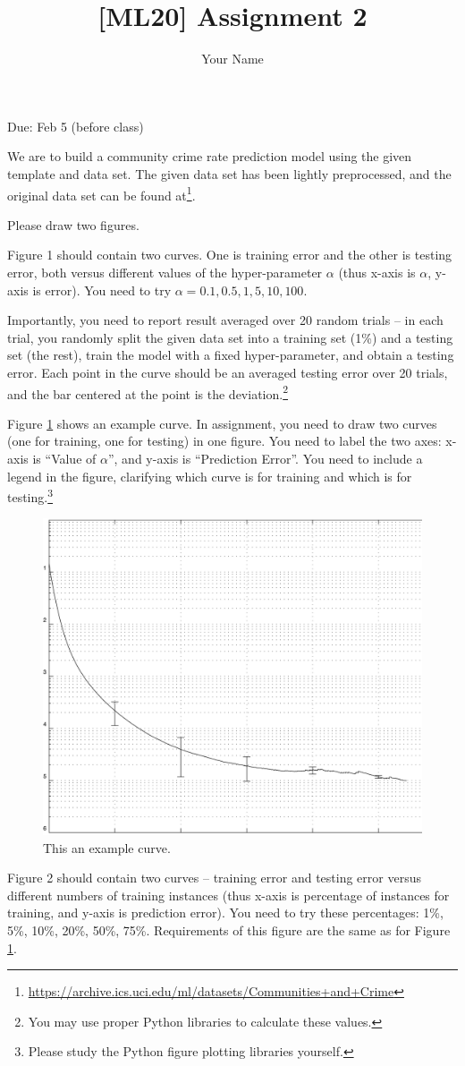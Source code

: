 \documentclass{llncs}
\title{[ML20] Assignment 2}
\author{Your Name}
\institute{}
\begin{document}
\maketitle 

\setlength\parindent{0pt} 
\setlength{\parskip}{10pt}

Due: Feb 5 (before class)

We are to build a community crime rate prediction model 
using the given template and data set. The given 
data set has been lightly preprocessed, and the 
original data set can be found at\footnote{ 
\url{https://archive.ics.uci.edu/ml/datasets/Communities+and+Crime}}. 

Please draw two figures. 

Figure 1 should contain two curves. One is 
training error and the other is testing error, 
both versus different values of the hyper-parameter $\alpha$ 
(thus x-axis is $\alpha$, y-axis is error). 
You need to try $\alpha = 0.1, 0.5, 1, 5, 10, 100$. 


Importantly, you need to report result averaged over 
20 random trials -- in each trial, you randomly 
split the given data set into a training set (1\%) 
and a testing set (the rest), train the model with 
a fixed hyper-parameter, and obtain a testing error. 
Each point in the curve should be an averaged testing 
error over 20 trials, and the bar centered at the 
point is the deviation.\footnote{You may use proper 
Python libraries to calculate these values.} 

Figure \ref{hw2_fig1} shows an example curve. 
In assignment, you need to draw two curves 
(one for training, one for testing) in one figure. 
You need to label the two axes: x-axis is ``Value of 
$\alpha$'', and y-axis is ``Prediction Error''. 
You need to include a legend in the figure, clarifying 
which curve is for training and which is for testing.\footnote{Please study the Python figure 
plotting libraries yourself.} 


\begin{figure}[h!] %
\centering %
\includegraphics[width=.4\textwidth]{figure/hw2_curve.png} %
\caption{This an example curve. } %
\label{hw2_fig1} %
\end{figure}

Figure 2 should contain two curves -- training error 
and testing error versus different numbers of training 
instances (thus x-axis is percentage of instances for 
training, and y-axis is prediction error). You need to 
try these percentages: 1\%, 5\%, 10\%, 20\%, 50\%, 75\%. 
Requirements of this figure are the same as for Figure
\ref{hw2_fig1}. 
\end{document}
